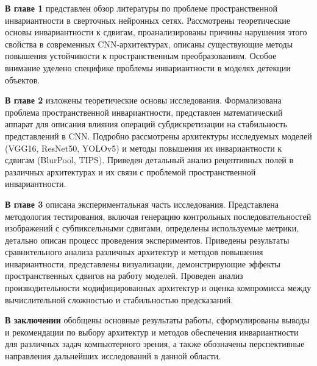 \textbf{В главе 1} представлен обзор литературы по проблеме пространственной инвариантности в сверточных нейронных сетях. Рассмотрены теоретические основы инвариантности к сдвигам, проанализированы причины нарушения этого свойства в современных CNN-архитектурах, описаны существующие методы повышения устойчивости к пространственным преобразованиям. Особое внимание уделено специфике проблемы инвариантности в моделях детекции объектов.

\textbf{В главе 2} изложены теоретические основы исследования. Формализована проблема пространственной инвариантности, представлен математический аппарат для описания влияния операций субдискретизации на стабильность представлений в CNN. Подробно рассмотрены архитектуры исследуемых моделей (VGG16, ResNet50, YOLOv5) и методы повышения их инвариантности к сдвигам (BlurPool, TIPS). Приведен детальный анализ рецептивных полей в различных архитектурах и их связи с проблемой пространственной инвариантности.

\textbf{В главе 3} описана экспериментальная часть исследования. Представлена методология тестирования, включая генерацию контрольных последовательностей изображений с субпиксельными сдвигами, определены используемые метрики, детально описан процесс проведения экспериментов. Приведены результаты сравнительного анализа различных архитектур и методов повышения инвариантности, представлены визуализации, демонстрирующие эффекты пространственных сдвигов на работу моделей. Проведен анализ производительности модифицированных архитектур и оценка компромисса между вычислительной сложностью и стабильностью предсказаний.

\textbf{В заключении} обобщены основные результаты работы, сформулированы выводы и рекомендации по выбору архитектур и методов обеспечения инвариантности для различных задач компьютерного зрения, а также обозначены перспективные направления дальнейших исследований в данной области.

\newpage
